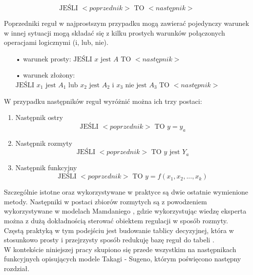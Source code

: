 \begin{equation}
\text{JEŚLI } <poprzednik> \text{ TO } <następnik> 
\end{equation}

Poprzedniki reguł w najprostszym przypadku mogą zawierać pojedynczy warunek w innej sytuacji mogą składać się z kilku prostych warunków połączonych operacjami logicznymi (i, lub, nie).

\begin{itemize}
\item[•] warunek prosty: $\text{JEŚLI } x \text{ jest } A \text{ TO } <następnik>$ \\
\item[•] warunek złożony: $\text{JEŚLI } x_1 \text{ jest } A_1 \text{ lub } x_2 \text{ jest } A_2 \text{ i } x_3 \text{ nie jest } A_3 \text{ TO } <następnik>$ \\
\end{itemize}

\newpage

W przypadku następników reguł wyróżnić można ich trzy postaci:

\begin{enumerate}
\item Następnik ostry
\begin{equation}
\text{JEŚLI } <poprzednik> \text{ TO } y = y_a
\end{equation}

\item Następnik rozmyty 
\begin{equation}
\text{JEŚLI } <poprzednik> \text{ TO } y \text{ jest } Y_a
\end{equation}

\item Następnik funkcyjny
\begin{equation}
\text{JEŚLI } <poprzednik> \text{ TO } y = f(x_1, x_2, ... , x_k)
\end{equation}
\end{enumerate}

\noindent Szczególnie istotne oraz wykorzystywane w praktyce są dwie ostatnie wymienione metody. Następniki w postaci zbiorów rozmytych są z powodzeniem wykorzystywane w modelach Mamdaniego \cite{170, 90}, gdzie wykorzystując wiedzę eksperta można z dużą dokładnością sterować obiektem regulacji w sposób rozmyty. Częstą praktyką w tym podejściu jest budowanie tablicy decyzyjnej, która w stosunkowo prosty i przejrzysty sposób redukuję bazę reguł do tabeli \cite{170}. \\
W kontekście niniejszej pracy skupiono się przede wszystkim na następnikach funkcyjnych opisujących modele Takagi - Sugeno, którym poświęcono następny rozdział. 

